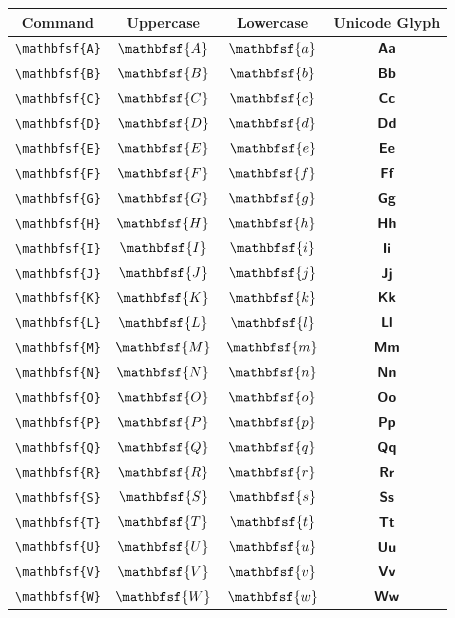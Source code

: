 \documentclass[12pt,a4paper]{article}
\begin{document}
\begin{longtable}{|c|c|c|c|}
\hline
\textbf{Command} & \textbf{Uppercase} & \textbf{Lowercase} & \textbf{Unicode Glyph} \\
\hline
\verb|\mathbfsf{A}| & $\mathbfsf{A}$ & $\mathbfsf{a}$ & $ 𝗔 𝗮 $ \\
\verb|\mathbfsf{B}| & $\mathbfsf{B}$ & $\mathbfsf{b}$ & $ 𝗕 𝗯 $ \\
\verb|\mathbfsf{C}| & $\mathbfsf{C}$ & $\mathbfsf{c}$ & $ 𝗖 𝗰 $ \\
\verb|\mathbfsf{D}| & $\mathbfsf{D}$ & $\mathbfsf{d}$ & $ 𝗗 𝗱 $ \\
\verb|\mathbfsf{E}| & $\mathbfsf{E}$ & $\mathbfsf{e}$ & $ 𝗘 𝗲 $ \\
\verb|\mathbfsf{F}| & $\mathbfsf{F}$ & $\mathbfsf{f}$ & $ 𝗙 𝗳 $ \\
\verb|\mathbfsf{G}| & $\mathbfsf{G}$ & $\mathbfsf{g}$ & $ 𝗚 𝗴 $ \\
\verb|\mathbfsf{H}| & $\mathbfsf{H}$ & $\mathbfsf{h}$ & $ 𝗛 𝗵 $ \\
\verb|\mathbfsf{I}| & $\mathbfsf{I}$ & $\mathbfsf{i}$ & $ 𝗜 𝗶 $ \\
\verb|\mathbfsf{J}| & $\mathbfsf{J}$ & $\mathbfsf{j}$ & $ 𝗝 𝗷 $ \\
\verb|\mathbfsf{K}| & $\mathbfsf{K}$ & $\mathbfsf{k}$ & $ 𝗞 𝗸 $ \\
\verb|\mathbfsf{L}| & $\mathbfsf{L}$ & $\mathbfsf{l}$ & $ 𝗟 𝗹 $ \\
\verb|\mathbfsf{M}| & $\mathbfsf{M}$ & $\mathbfsf{m}$ & $ 𝗠 𝗺 $ \\
\verb|\mathbfsf{N}| & $\mathbfsf{N}$ & $\mathbfsf{n}$ & $ 𝗡 𝗻 $ \\
\verb|\mathbfsf{O}| & $\mathbfsf{O}$ & $\mathbfsf{o}$ & $ 𝗢 𝗼 $ \\
\verb|\mathbfsf{P}| & $\mathbfsf{P}$ & $\mathbfsf{p}$ & $ 𝗣 𝗽 $ \\
\verb|\mathbfsf{Q}| & $\mathbfsf{Q}$ & $\mathbfsf{q}$ & $ 𝗤 𝗾 $ \\
\verb|\mathbfsf{R}| & $\mathbfsf{R}$ & $\mathbfsf{r}$ & $ 𝗥 𝗿 $ \\
\verb|\mathbfsf{S}| & $\mathbfsf{S}$ & $\mathbfsf{s}$ & $ 𝗦 𝘀 $ \\
\verb|\mathbfsf{T}| & $\mathbfsf{T}$ & $\mathbfsf{t}$ & $ 𝗧 𝘁 $ \\
\verb|\mathbfsf{U}| & $\mathbfsf{U}$ & $\mathbfsf{u}$ & $ 𝗨 𝘂 $ \\
\verb|\mathbfsf{V}| & $\mathbfsf{V}$ & $\mathbfsf{v}$ & $ 𝗩 𝘃 $ \\
\verb|\mathbfsf{W}| & $\mathbfsf{W}$ & $\mathbfsf{w}$ & $ 𝗪 𝘄 $ \\

\end{longtable}
\end{document}
